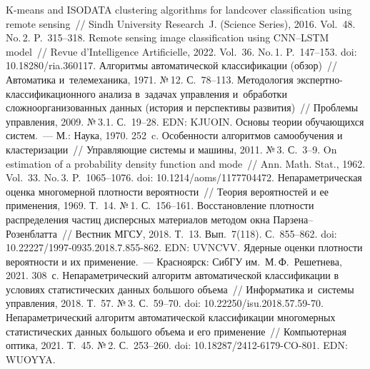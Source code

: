 \begin{multicols}{2}
{\small\frenchspacing
 {\baselineskip=10.6pt
 \begin{thebibliography}{99}
 K-means and 
ISODATA clustering algorithms for landcover classification using remote sensing~// Sindh 
University Research~J. (Science Series), 2016. Vol.~48. No.\,2. P.~315--318.
 Remote sensing image classification using 
CNN--LSTM model~// Revue d'Intelligence Artificielle, 2022. Vol.~36. No.\,1. P.~147--153. doi: 
10.18280/ria.360117.
 Алгоритмы автоматической классификации (обзор)~// Автоматика 
и~телемеханика, 1971. №\,12. С.~78--113.
 Методология экс\-перт\-но-клас\-си\-фи\-ка\-ци\-он\-но\-го анализа в~задачах 
управления и~обработки сложноорганизованных данных (история и перспективы 
развития)~// Проб\-ле\-мы управ\-ле\-ния, 2009. №\,3.1. С.~19--28. EDN: \mbox{KJUOIN}.
 Основы теории обучающихся систем.~--- М.: Наука, 1970. 252~c.
 Особенности алгоритмов самообучения и кластеризации~//  
Управ\-ля\-ющие сис\-те\-мы и машины, 2011. №\,3. С.~3--9.
 On estimation of a probability density function and mode~// Ann. Math. Stat., 1962. 
Vol.~33. No.\,3. P.~1065--1076. doi: 10.1214/aoms/1177704472.
 Непараметрическая оценка многомерной плотности вероятности~// 
Теория вероятностей и ее применения, 1969. Т.~14. №\,1. С.~156--161.
 Восстановление плотности распределения частиц дисперсных 
материалов методом окна Пар\-зе\-на--Ро\-зен\-блат\-та~// Вестник МГСУ, 2018. Т.~13. 
Вып.~7(118). С.~855--862. doi: 10.22227/1997-0935.2018.7.855-862. EDN: UVNCVV.
 Ядерные оценки плотности вероятности и их применение.~--- 
Красноярск: СибГУ им.\ М.\,Ф.~Решетнева, 2021. 308~с.
 Непараметрический алгоритм автоматической классификации 
в условиях статистических данных большого объема~// Информатика и~сис\-те\-мы  
управ\-ле\-ния, 2018. Т.~57. №\,3. С.~59--70. doi: 10.22250/isu.2018.57.59-70.
Непараметрический алгоритм автоматической классификации многомерных статистических 
данных большого объема и его применение~// Компьютерная оптика, 2021. Т.~45. №\,2. 
С.~253--260. doi: 10.18287/2412-6179-CO-801. EDN: WUOYYA.


\end{thebibliography}}}
\end{multicols}
